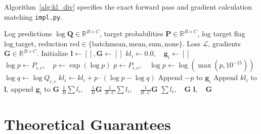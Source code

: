 \documentclass[11pt]{article}
\begin{document}
Algorithm~\ref{alg:kl_div} specifies the exact forward pass and gradient calculation matching \texttt{impl.py}.

\begin{algorithm}[H]
\caption{Kullback-Leibler Divergence Loss Forward and Gradient Evaluation}
\label{alg:kl_div}
\begin{algorithmic}[1]
\Require Log predictions $\log\mathbf{Q} \in \mathbb{R}^{B \times C}$, target probabilities $\mathbf{P} \in \mathbb{R}^{B \times C}$, log target flag $\mathrm{log\_target}$, reduction $\mathrm{red} \in \{\text{batchmean}, \text{mean}, \text{sum}, \text{none}\}$.
\Ensure Loss $\mathcal{L}$, gradients $\mathbf{G} \in \mathbb{R}^{B \times C}$.
\State Initialize $\mathbf{l} \gets [], \mathbf{G} \gets []$
    \State $kl_i \gets 0.0, \quad \mathbf{g}_i \gets []$
            \State $\log p \gets P_{i, c}, \quad p \gets \exp(\log p)$
        \Else
            \State $p \gets P_{i, c}, \quad \log p \gets \log(\max(p, 10^{-15}))$
        \EndIf
        \State $\log q \gets \log Q_{i, c}$
            \State $kl_i \gets kl_i + p \cdot (\log p - \log q)$
        \EndIf
        \State Append $-p$ to $\mathbf{g}_i$
    \EndFor
    \State Append $kl_i$ to $\mathbf{l}$, append $\mathbf{g}_i$ to $\mathbf{G}$
\EndFor
{}
    \State \Return $\frac{1}{B}\sum l_i, \quad \frac{1}{B}\mathbf{G}$
    \State \Return $\frac{1}{B \cdot C}\sum l_i, \quad \frac{1}{B \cdot C}\mathbf{G}$
    \State \Return $\sum l_i, \quad \mathbf{G}$
\Else
    \State \Return $\mathbf{l}, \quad \mathbf{G}$
\EndIf
\end{algorithmic}
\end{algorithm}

\section{Theoretical Guarantees}
\label{sec:guarantees}
\end{document}
